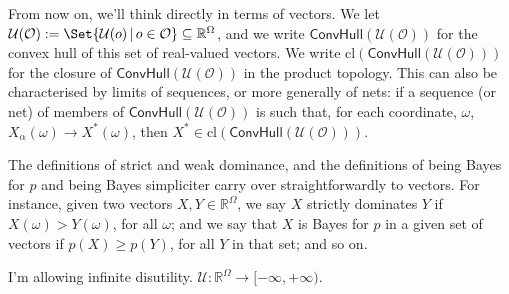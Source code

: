 \documentclass[a4paper,final]{article}
\newtheorem{definition}[theorem]{Definition}
\newcommand\cl{\mathrm{cl}}
\renewcommand\O{\mathcal{O}}
\newcommand\Uwald{\mathcal{U}} %
\renewcommand{\Re}{\mathbb{R}}
\newcommand{\Conv}{\mathsf{ConvHull}}
\newcommand\SetDelimiter[1][]{
	\nonscript\,#1\vert \allowbreak \nonscript\,\mathopen{}}
\providecommand\given{\SetDelimiter}
\renewcommand{\geq}{\geqslant}
\newenvironment{CCM rewritten}
{\begingroup\color{blue}} %
{\endgroup}              %
\begin{document}
	From now on, we'll think directly in terms of vectors. We let $\Uwald(\O) := \Set{\Uwald(o)\given o\in \O}\subseteq\Re^\Omega$, and we write $\Conv(\Uwald(\O))$ for the convex hull of this set of real-valued vectors. We write $\cl(\Conv(\Uwald(\O)))$ for the closure of $\Conv(\Uwald(\O))$ in the product topology. This can also be characterised by limits of sequences, or more generally of nets: if a sequence (or net) of members of $\Conv(\Uwald(\O))$ is such that, for each coordinate, $\omega$, $X_\alpha(\omega)\longrightarrow X^*(\omega)$, then $X^*\in\cl(\Conv(\Uwald(\O)))$. 
	
	
	The definitions of strict and weak dominance, and the definitions of being Bayes for $p$ and being Bayes simpliciter carry over straightforwardly to vectors. For instance, given two vectors $X, Y \in \Re^\Omega$, we say $X$ strictly dominates $Y$ if $X(\omega) > Y(\omega)$, for all $\omega$; and we say that $X$ is Bayes for $p$ in a given set of vectors if $p(X) \geq p(Y)$, for all $Y$ in that set; and so on.
	
	\begin{infversion}
		I'm allowing infinite disutility. $\Uwald:\Re^\Omega\to[-\infty,+\infty)$. 
	\end{infversion}
	
\end{document}
